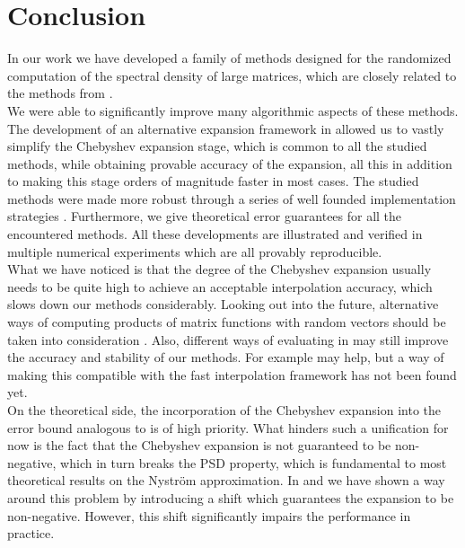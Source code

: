\chapter{Conclusion}
\label{chp:6-conclusion}

In our work we have developed a family of methods
designed for the randomized computation of the spectral density of large matrices,
which are closely related to the methods from \cite{lin2017randomized}.\\

We were able to
significantly improve many algorithmic aspects of these methods. The development
of an alternative expansion framework in 
allowed us to vastly simplify the Chebyshev expansion stage, which is common to all the
studied methods, while obtaining provable accuracy of the expansion, all this in
addition to making this stage orders of magnitude faster in most cases. 
The studied methods were made more robust through a series of well founded
implementation strategies .
Furthermore, we give theoretical error guarantees for all the encountered methods.
All these developments are illustrated and verified in multiple numerical experiments
which are all provably reproducible.\\

What we have noticed is that the degree of the Chebyshev expansion usually needs
to be quite high to achieve an acceptable interpolation accuracy, which slows down
our methods considerably. Looking out into the future, alternative ways of
computing products of matrix functions with random vectors should be taken into
consideration \cite{cortinovis2023speeding,ubaru2017lanczos}. Also, different ways
of evaluating  in 
may still improve the accuracy and stability of our methods. For example
\cite[algorithm~5.6]{tropp2023randomized} may help, but a way of making this
compatible with the fast interpolation framework has not been found yet.\\

On the theoretical side, the incorporation of the Chebyshev expansion into the
error bound analogous to  is of high priority.
What hinders such a unification for now is the fact that the Chebyshev expansion
is not guaranteed to be non-negative, which in turn breaks the \gls{PSD} property,
which is fundamental to most theoretical results on the Nystr\"om approximation.
In  and 
we have shown a way around this problem by introducing a shift which guarantees
the expansion to be non-negative. However, this shift significantly impairs the
performance in practice.
